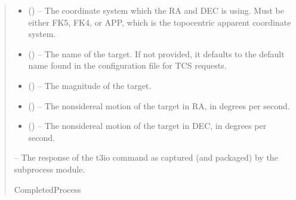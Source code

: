 \documentclass[letterpaper,11pt,english]{sphinxmanual}
\begin{document}
\begin{savenotes}
\begin{fulllineitems}
\begin{quote}
\begin{description}
\begin{itemize}
\item {} 
\sphinxAtStartPar
{} (\sphinxstyleliteralemphasis{\sphinxupquote{, }}) – The coordinate system which the RA and DEC is using. Must be either
FK5, FK4, or APP, which is the topocentric apparent coordinate system.

\item {} 
\sphinxAtStartPar
{} (\sphinxstyleliteralemphasis{\sphinxupquote{, }}) – The name of the target. If not provided, it defaults to the
default name found in the configuration file for TCS requests.

\item {} 
\sphinxAtStartPar
{} (\sphinxstyleliteralemphasis{\sphinxupquote{, }}) – The magnitude of the target.

\item {} 
\sphinxAtStartPar
{} (\sphinxstyleliteralemphasis{\sphinxupquote{, }}) – The non\sphinxhyphen{}sidereal motion of the target in RA, in degrees per second.

\item {} 
\sphinxAtStartPar
{} (\sphinxstyleliteralemphasis{\sphinxupquote{, }}) – The non\sphinxhyphen{}sidereal motion of the target in DEC, in degrees per second.

\end{itemize}

\sphinxAtStartPar
{} – The response of the t3io command as captured (and packaged) by
the subprocess module.

\sphinxAtStartPar
CompletedProcess

\end{description}\end{quote}

\end{fulllineitems}\end{savenotes}
\end{document}
